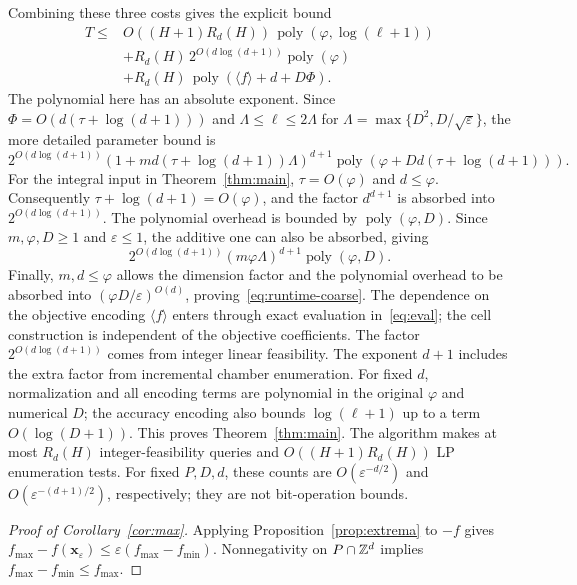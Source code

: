 \documentclass[11pt]{article}
\theoremstyle{definition}\newtheorem{definition}{Definition}[section]
\theoremstyle{remark}\newtheorem{remark}[theorem]{Remark}
\newcommand{\eps}{\varepsilon}
\newcommand{\poly}{\operatorname{poly}}
\begin{document}
Combining these three costs gives the explicit bound
\begin{equation}\label{eq:runtime-detailed}
\begin{aligned}
 T\le{}&O((H+1)R_d(H))\,\poly(\varphi,\log(\ell+1))\\
       &+R_d(H)\,2^{O(d\log(d+1))}\poly(\varphi)\\
       &+R_d(H)\,\poly(\langle f\rangle+d+D\Phi).
\end{aligned}
\end{equation}
The polynomial here has an absolute exponent. Since $\Phi=O(d(\tau+\log(d+1)))$ and $\Lambda\le\ell\le2\Lambda$ for $\Lambda=\max\{D^2,D/\sqrt\eps\}$, the more detailed parameter bound is
\[
 2^{O(d\log(d+1))}
 \left(1+md(\tau+\log(d+1))\Lambda\right)^{d+1}
 \poly\!\left(\varphi+Dd(\tau+\log(d+1))\right).
\]
For the integral input in Theorem~\ref{thm:main}, $\tau=O(\varphi)$ and $d\le\varphi$. Consequently $\tau+\log(d+1)=O(\varphi)$, and the factor $d^{d+1}$ is absorbed into $2^{O(d\log(d+1))}$. The polynomial overhead is bounded by $\poly(\varphi,D)$. Since $m,\varphi,D\ge1$ and $\eps\le1$, the additive one can also be absorbed, giving
\[
 2^{O(d\log(d+1))}
 \left(m\varphi\Lambda\right)^{d+1}
 \poly(\varphi,D).
\]
Finally, $m,d\le\varphi$ allows the dimension factor and the polynomial overhead to be absorbed into $(\varphi D/\eps)^{O(d)}$, proving~\eqref{eq:runtime-coarse}. The dependence on the objective encoding $\langle f\rangle$ enters through exact evaluation in~\eqref{eq:eval}; the cell construction is independent of the objective coefficients.
The factor $2^{O(d\log(d+1))}$ comes from integer linear feasibility. The exponent $d+1$ includes the extra factor from incremental chamber enumeration. For fixed $d$, normalization and all encoding terms are polynomial in the original $\varphi$ and numerical $D$; the accuracy encoding also bounds $\log(\ell+1)$ up to a term $O(\log(D+1))$. This proves Theorem~\ref{thm:main}. The algorithm makes at most $R_d(H)$ integer-feasibility queries and $O((H+1)R_d(H))$ LP enumeration tests. For fixed $P,D,d$, these counts are $O(\eps^{-d/2})$ and $O(\eps^{-(d+1)/2})$, respectively; they are not bit-operation bounds.

\begin{proof}[Proof of Corollary~\ref{cor:max}]
Applying Proposition~\ref{prop:extrema} to $-f$ gives $f_{\max}-f(\mathbf{x}_{\eps})\le\eps (f_{\max}-f_{\min})$. Nonnegativity on $P\cap\mathbb Z^d$ implies $f_{\max}-f_{\min}\le f_{\max}$.
\end{proof}
\end{document}
